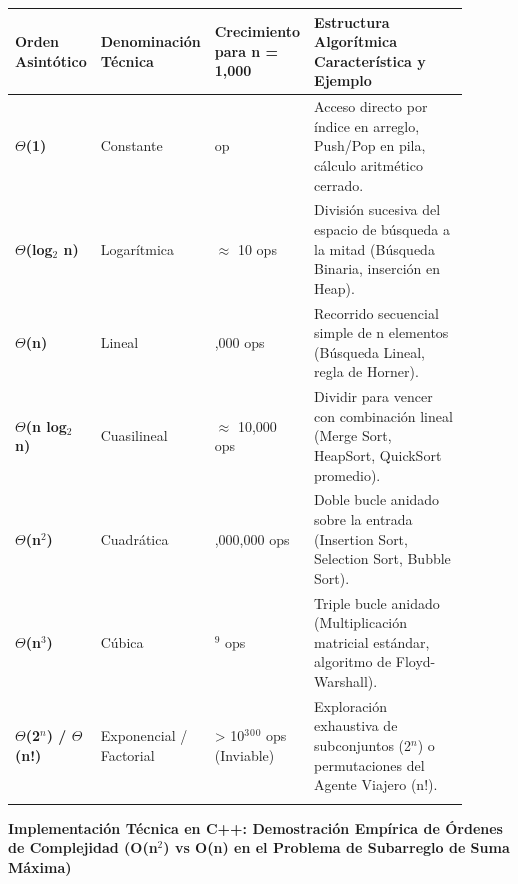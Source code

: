 \documentclass[11pt,letterpaper]{article}
\begin{document}
\begin{tabular}{>{\raggedright\arraybackslash}p{0.152\linewidth}>{\raggedright\arraybackslash}p{0.180\linewidth}>{\raggedright\arraybackslash}p{0.180\linewidth}>{\raggedright\arraybackslash}p{0.388\linewidth}}
\toprule
\textbf{\color{ipnguinda}Orden Asintótico} & \textbf{\color{ipnguinda}Denominación Técnica} & \textbf{\color{ipnguinda}Crecimiento para n = 1,000} & \textbf{\color{ipnguinda}Estructura Algorítmica Característica y Ejemplo} \\
\midrule
\textbf{$\Theta$(1)} & Constante & 1 op & Acceso directo por índice en arreglo, Push/Pop en pila, cálculo aritmético cerrado. \\
\addlinespace[3pt]
\textbf{$\Theta$(log$_2$ n)} & Logarítmica & $\approx$ 10 ops & División sucesiva del espacio de búsqueda a la mitad (Búsqueda Binaria, inserción en Heap). \\
\addlinespace[3pt]
\textbf{$\Theta$(n)} & Lineal & 1,000 ops & Recorrido secuencial simple de n elementos (Búsqueda Lineal, regla de Horner). \\
\addlinespace[3pt]
\textbf{$\Theta$(n log$_2$ n)} & Cuasilineal & $\approx$ 10,000 ops & Dividir para vencer con combinación lineal (Merge Sort, HeapSort, QuickSort promedio). \\
\addlinespace[3pt]
\textbf{$\Theta$(n$^2$)} & Cuadrática & 1,000,000 ops & Doble bucle anidado sobre la entrada (Insertion Sort, Selection Sort, Bubble Sort). \\
\addlinespace[3pt]
\textbf{$\Theta$(n$^3$)} & Cúbica & 10$^9$ ops & Triple bucle anidado (Multiplicación matricial estándar, algoritmo de Floyd-Warshall). \\
\addlinespace[3pt]
\textbf{$\Theta$(2$^n$) / $\Theta$(n!)} & Exponencial / Factorial & > 10$^3$$^0$$^0$ ops (Inviable) & Exploración exhaustiva de subconjuntos (2$^n$) o permutaciones del Agente Viajero (n!). \\
\addlinespace[3pt]
\bottomrule
\end{tabular}
\vspace{6pt}\par
\vspace{4pt}\noindent\textbf{\color{ipnblue}Implementación Técnica en C++: Demostración Empírica de Órdenes de Complejidad (O(n$^2$) vs O(n) en el Problema de Subarreglo de Suma Máxima)}\par\vspace{-2pt}
\end{document}
